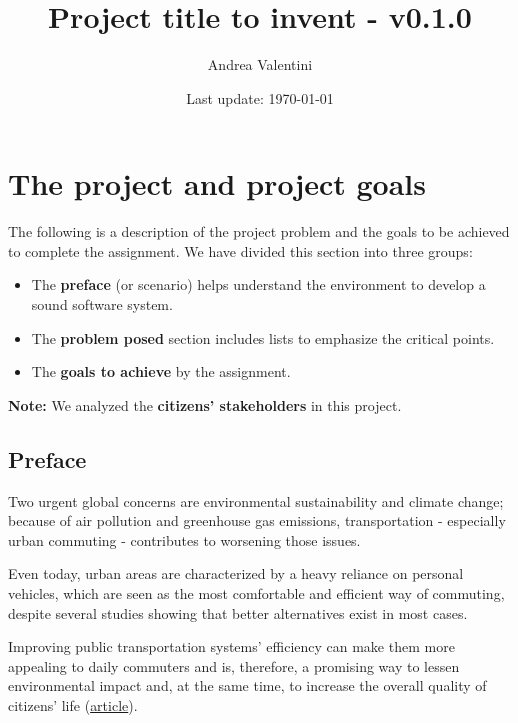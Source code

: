 \documentclass[a4paper]{article}
\newcommand{\highspace}{\vspace{1.2em}\noindent}
\begin{document}
    \author{Andrea Valentini}
    \title{Project title to invent - v0.1.0}
    \date{Last update: \today}
    \maketitle

    \newpage

    \tableofcontents

    \newpage

    \pagestyle{fancy}
    \fancyhead{} %
    \fancyhead[R]{\nouppercase{\leftmark\hfill\rightmark}}

    \section{The project and project goals}

    The following is a description of the project problem and the goals to be achieved to complete the assignment. We have divided this section into three groups:
    \begin{itemize}
        \item The \textbf{preface} (or scenario) helps understand the environment to develop a sound software system.

        \item The \textbf{problem posed} section includes lists to emphasize the critical points.

        \item The \textbf{goals to achieve} by the assignment.
    \end{itemize}
    \textbf{Note:} We analyzed the \textbf{citizens' stakeholders} in this project. 

    \subsection*{Preface}

    Two urgent global concerns are environmental sustainability and climate change; because of air pollution and greenhouse gas emissions, transportation - especially urban commuting - contributes to worsening those issues.

    \highspace
    Even today, urban areas are characterized by a heavy reliance on personal vehicles, which are seen as the most comfortable and efficient way of commuting, despite several studies showing that better alternatives exist in most cases.

    \highspace
    Improving public transportation systems' efficiency can make them more appealing to daily commuters and is, therefore, a promising way to lessen environmental impact and, at the same time, to increase the overall quality of citizens' life (\href{https://journals.plos.org/plosone/article?id=10.1371/journal.pone.0223650}{article}).
\end{document}
